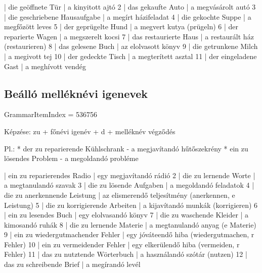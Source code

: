 \documentclass{article}
\newenvironment{desc}{\verbatim}{\endverbatim}
\newenvironment{exmp}{\verbatim}{\endverbatim}
\begin{document}
\begin{exmp}
1 | die geöffnete Tür | a kinyitott ajtó
2 | das gekaufte Auto | a megvásárolt autó
3 | die geschriebene Hausaufgabe | a megírt házifeladat
4 | die gekochte Suppe | a megfőzött leves
5 | der geprügelte Hund | a megvert kutya (prügeln)
6 | der reparierte Wagen | a megszerelt kocsi
7 | das restaurierte Haus | a restaurált ház (restaurieren)
8 | das gelesene Buch | az elolvasott könyv
9 | die getrunkene Milch | a megivott tej
10 | der gedeckte Tisch | a megterített asztal
11 | der eingeladene Gast | a meghívott vendég
\end{exmp}

\subsection{Beálló melléknévi igenevek}

GrammarItemIndex = 536756

\begin{desc}
Képzése: zu + főnévi igenév + d + melléknév végződés

Pl.: * der zu reparierende Kühlschrank - a megjavítandó hűtőszekrény
* ein zu lösendes Problem - a megoldandó probléme
\end{desc}

\begin{exmp}
1 | ein zu reparierendes Radio | egy megjavítandó rádió
2 | die zu lernende Worte | a megtanulandó szavak
3 | die zu lösende Aufgaben | a megoldandó feladatok
4 | die zu anerkennende Leistung | az elismerendő teljesítmény (anerkennen, e Leistung)
5 | die zu korrigierende Arbeiten | a kijavítandó munkák (korrigieren)
6 | ein zu lesendes Buch | egy elolvasandó könyv
7 | die zu waschende Kleider | a kimosandó ruhák
8 | die zu lernende Materie | a megtanulandó anyag (e Materie)
9 | ein zu wiedergutmachender Fehler | egy jóváteendő hiba (wiedergutmachen, r Fehler)
10 | ein zu vermeidender Fehler | egy elkerülendő hiba (vermeiden, r Fehler)
11 | das zu nutztende Wörterbuch | a használandó szótár (nutzen)
12 | das zu schreibende Brief | a megírandó levél
\end{exmp}
\end{document}
